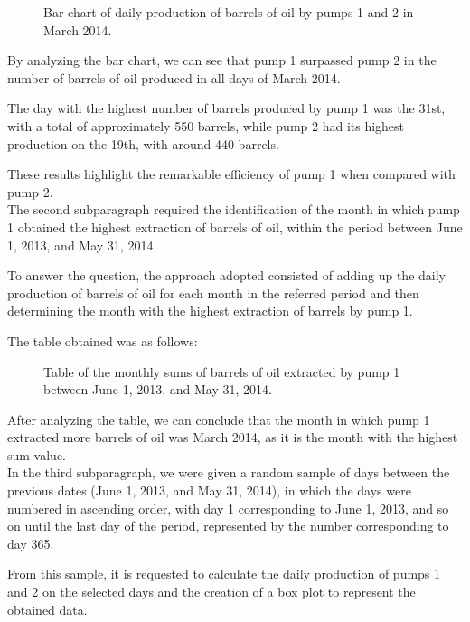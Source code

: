 \documentclass[conference]{IEEEtran}
\begin{document}
\begin{figure}[H]
    \caption{Bar chart of daily production of barrels of oil by pumps 1 and 2 in March 2014.}
    \label{pump_barChart_dailyProduction}
\end{figure}

By analyzing the bar chart, we can see that pump 1 surpassed pump 2 in the number of barrels of oil produced in all days of March 2014. 

The day with the highest number of barrels produced by pump 1 was the 31st, with a total of approximately 550 barrels, while pump 2 had its highest production on the 19th, with around 440 barrels. 

These results highlight the remarkable efficiency of pump 1 when compared with pump 2.\\

The second subparagraph required the identification of the month in which pump 1 obtained the highest extraction of barrels of oil, within the period between June 1, 2013, and May 31, 2014.

To answer the question, the approach adopted consisted of adding up the daily production of barrels of oil for each month in the referred period and then determining the month with the highest extraction of barrels by pump 1.

The table obtained was as follows:

\begin{figure}[H]
    \caption{Table of the monthly sums of barrels of oil extracted by pump 1 between June 1, 2013, and May 31, 2014.}
    \label{pump_table_monthlySums}
\end{figure}

After analyzing the table, we can conclude that the month in which pump 1 extracted more barrels of oil was March 2014, as it is the month with the highest sum value.\\

In the third subparagraph, we were given a random sample of days between the previous dates (June 1, 2013, and May 31, 2014), in which the days were numbered in ascending order, with day 1 corresponding to June 1, 2013, and so on until the last day of the period, represented by the number corresponding to day 365.

From this sample, it is requested to calculate the daily production of pumps 1 and 2 on the selected days and the creation of a box plot to represent the obtained data.
\end{document}
